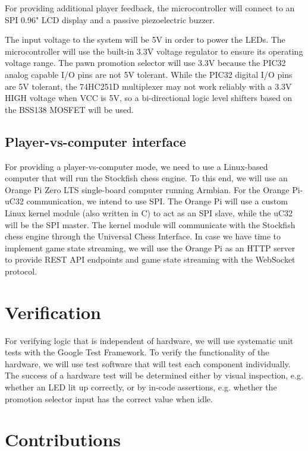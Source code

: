 \documentclass{article}
\begin{document}
For providing additional player feedback, the microcontroller will connect to an SPI 0.96" LCD display and a passive piezoelectric buzzer.

The input voltage to the system will be 5V in order to power the LEDs. The microcontroller will use the built-in 3.3V voltage regulator to ensure its operating voltage range. The pawn promotion selector will use 3.3V because the PIC32 analog capable I/O pins are not 5V tolerant. While the PIC32 digital I/O pins are 5V tolerant, the 74HC251D multiplexer may not work reliably with a 3.3V HIGH voltage when VCC is 5V, so a bi-directional logic level shifters based on the BSS138 MOSFET will be used.

\subsection*{Player-vs-computer interface}

For providing a player-vs-computer mode, we need to use a Linux-based computer that will run the Stockfish chess engine. To this end, we will use an Orange Pi Zero LTS single-board computer running Armbian. For the Orange Pi-uC32 communication, we intend to use SPI. The Orange Pi will use a custom Linux kernel module (also written in C) to act as an SPI slave, while the uC32 will be the SPI master. The kernel module will communicate with the Stockfish chess engine through the Universal Chess Interface. In case we have time to implement game state streaming, we will use the Orange Pi as an HTTP server to provide REST API endpoints and game state streaming with the WebSocket protocol.

\section{Verification}

For verifying logic that is independent of hardware, we will use systematic unit tests with the Google Test Framework. To verify the functionality of the hardware, we will use test software that will test each component individually. The success of a hardware test will be determined either by visual inspection, e.g. whether an LED lit up correctly, or by in-code assertions, e.g. whether the promotion selector input has the correct value when idle.

\section{Contributions}
\end{document}
